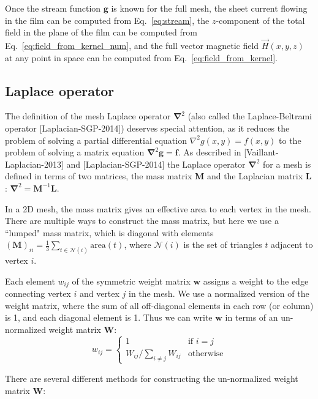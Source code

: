 \documentclass{article}
\begin{document}
Once the stream function $\mathbf{g}$ is known for the full mesh,
the sheet current flowing in the film can be computed from Eq.~\ref{eq:stream}, the $z$-component of the total field in the plane of the film can be computed
from Eq.~\ref{eq:field_from_kernel_num}, and the full vector magnetic field $\vec{H}(x, y, z)$
at any point in space can be computed from Eq.~\ref{eq:field_from_kernel}.

\subsection{Laplace operator}
\label{section:implementation:laplace}

The definition of the mesh Laplace operator $\mathbf{\nabla}^2$ (also called the Laplace-Beltrami operator [Laplacian-SGP-2014]) deserves special attention, as it reduces the problem of solving a partial differential equation $\nabla^2g(x,y)=f(x,y)$ to the problem of solving a matrix equation
$\mathbf{\nabla}^2\mathbf{g}=\mathbf{f}$. As described in [Vaillant-Laplacian-2013] and [Laplacian-SGP-2014] the Laplace operator $\mathbf{\nabla}^2$ for a mesh is defined in terms of two matrices, the mass matrix $\mathbf{M}$ and the
Laplacian matrix $\mathbf{L}$: $\mathbf{\nabla}^2 = \mathbf{M}^{-1}\mathbf{L}$.


In a 2D mesh, the mass matrix gives an effective area to each vertex in the mesh. There are multiple ways to construct the mass matrix, but here we use a ``lumped" mass matrix, which is diagonal with elements $(\mathbf{M})_{ii} = \frac{1}{3}\sum_{t\in\mathcal{N}(i)}\mathrm{area}(t)$,
where $\mathcal{N}(i)$ is the set of triangles $t$ adjacent to vertex $i$.

Each element $w_{ij}$ of the symmetric weight matrix $\mathbf{w}$ assigns a weight to the edge connecting vertex $i$ and vertex $j$ in the mesh. We use a normalized version of the weight matrix, where the sum of all off-diagonal elements in each row (or column) is 1, and each diagonal element is 1. Thus we can write $\mathbf{w}$ in terms of an un-normalized weight matrix $\mathbf{W}$:
$$
    w_{ij} = \begin{cases}
        1&\text{if }i = j\\
        W_{ij} / \sum_{i\neq j} W_{ij}&\text{otherwise}
    \end{cases}
$$

There are several different methods for constructing the un-normalized weight matrix $\mathbf{W}$:
\end{document}
